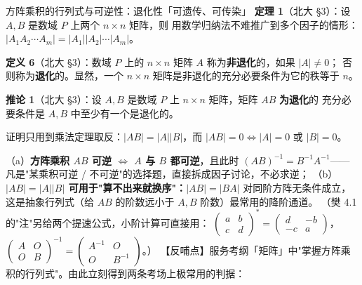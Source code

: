 \begin{fdeep}{方阵乘积的行列式与可逆性：退化性「可遗传、可传染」}
\textbf{定理 1}（北大 §3）：设 $A,B$ 是数域 $P$ 上两个 $n\times n$ 矩阵，则
用数学归纳法不难推广到多个因子的情形：$|A_1A_2\cdots A_m|=|A_1||A_2|\cdots|A_m|$。

\textbf{定义 6}（北大 §3）：数域 $P$ 上的 $n\times n$ 矩阵 $A$ 称为\textbf{非退化}的，如果 $|A|\ne 0$；
否则称为\textbf{退化}的。显然，一个 $n\times n$ 矩阵是非退化的充分必要条件为它的秩等于 $n$。

\textbf{推论 1}（北大 §3）：设 $A,B$ 是数域 $P$ 上 $n\times n$ 矩阵，矩阵 $AB$ \textbf{为退化}的
充分必要条件是 $A,B$ 中至少有一个是退化的。

证明只用到乘法定理取反：$|AB|=|A||B|$，而 $|AB|=0\iff |A|=0$ 或 $|B|=0$。

（a）\textbf{方阵乘积 $AB$ 可逆 $\iff$ $A$ 与 $B$ 都可逆}，且此时 $(AB)^{-1}=B^{-1}A^{-1}$——
凡是"某乘积可逆 / 不可逆"的选择题，直接拆成因子讨论，不必求逆；
（b）\textbf{$|AB|=|A||B|$ 可用于"算不出来就换序"：}$|AB|=|BA|$ 对同阶方阵无条件成立，
这是抽象行列式（给 $AB$ 的阶数远小于 $A,B$ 阶数）最常用的降阶通道。
（樊 4.1 的"注"另给两个提速公式，小阶计算可直接用：
$\begin{pmatrix}a&b\\c&d\end{pmatrix}^{*}=\begin{pmatrix}d&-b\\-c&a\end{pmatrix}$，
$\begin{pmatrix}A&O\\O&B\end{pmatrix}^{-1}=\begin{pmatrix}A^{-1}&O\\O&B^{-1}\end{pmatrix}$。）
【反哺点】服务考纲「矩阵」中"掌握方阵乘积的行列式"。由此立刻得到两条考场上极常用的判据：
\end{fdeep}



